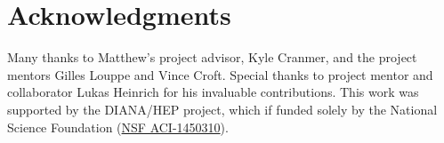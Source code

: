 \section{Acknowledgments}\label{section:acknowledgments}
Many thanks to Matthew's project advisor, Kyle Cranmer, and the project mentors Gilles Louppe and Vince Croft.
Special thanks to project mentor and collaborator Lukas Heinrich for his invaluable contributions.
This work was supported by the DIANA/HEP project, which if funded solely by the National Science Foundation (\href{https://www.nsf.gov/awardsearch/showAward?AWD\_ID=1450310}{NSF ACI-1450310}).
